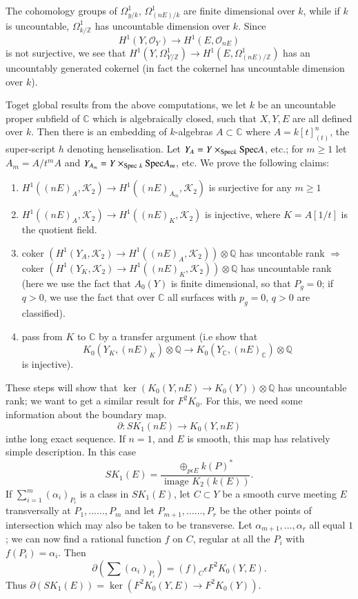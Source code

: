 The cohomology groups of $\Omega^{1}_{y/k}$, $\Omega^{1}_{(n E)/k}$  are finite dimensional over $k$, while if $k$ is uncountable, $\Omega^{1}_{k/\mathbb{Z}}$ has uncountable dimension over $k$. Since 
$$
H^{1}(Y, \mathscr{O}_Y)\to H^{1}(E, \mathscr{O}_{n E})
$$
is not surjective, we see that $H^{1}\left(Y, \Omega^{1}_{Y/\mathbb{Z}}\right)\to H^{1}\left(E, \Omega^{1}_{(n E)/\mathbb{Z}}\right)$ has an uncountably generated cokernel (in fact the cokernel has uncountable dimension over $k$). 

To\pageoriginale get global results from the above computations, we let $k$ be an uncountable proper subfield of $\mathbb{C}$ which is algebraically closed, such that $X, Y, E$ are all defined over $k$. Then there is an embedding of $k$-algebras $A\subset \mathbb{C}$ where $A=k[t]^{n}_{(t)}$, the super-script $h$ denoting henselisation. Let $Y_A=Y\times_{\mathrm{Spec} k}\mathrm{Spec} A$, etc.; for $m\geq 1$ let $A_m=A/t^{m} A$ and $Y_{A_{m}}=Y\times _{\mathrm{Spec}\ k}\mathrm{Spec} A_m$, etc. We prove the following claims: 
\begin{enumerate}
\renewcommand{\theenumi}{\roman{enumi}}
\renewcommand{\labelenumi}{(\theenumi)}
\item $H^{1}((nE)_A, \mathscr{K}_2)\to H^{1}((nE)_{A_m}, \mathscr{K}_2)$ is surjective for any $m\geq 1$ 
\item $H^{1}((n E)_A, \mathscr{K}_2)\to H^{1}((n E)_K, \mathscr{K}_2)$ is injective, where $K=A[1/t]$ is the quotient field. 
\item coker $(H^{1}(Y_A, \mathscr{K}_2)\to H^{1}((n E)_A, \mathscr{K}_2))\otimes \mathbb{Q}$ has uncontable rank $\Rightarrow$ coker $(H^{1}(Y_K, \mathscr{K}_2)\to H^{1}((nE)_K, \mathscr{K}_2))\otimes \mathbb{Q}$ has uncountable rank (here we use the fact that $A_0(Y)$ is finite dimensional, so that $P_g=0$; if $q>0$, we use the fact that over $\mathbb{C}$ all surfaces with $p_g=0$, $q>0$ are classified). 
\item pass from $K$ to $\mathbb{C}$ by a transfer argument (i.e show that 
$$
K_0(Y_K, (nE)_K)\otimes \mathbb{Q}\to K_0(Y_{\mathbb{C}}, (n E)_{\mathbb{C}})\otimes \mathbb{Q}
$$ 
is injective). 
\end{enumerate}

These steps will show that $\ker (K_0(Y, nE)\to K_0(Y))\otimes \mathbb{Q}$ has uncountable rank; we want to get a similar result for $F^{2}K_0$. For this, we need some information about the boundary map. 
$$
\partial:SK_1(nE)\to K_0(Y, nE)
$$
in\pageoriginale the long exact sequence. If $n=1$, and $E$ is smooth, this map has relatively simple description. In this case 
$$
SK_1(E)=\dfrac{\displaystyle\mathop{\oplus}_{p \epsilon E}k(P)^{\ast}}{\text{ image } K_2(k(E))}.
$$ 
If $\sum\limits_{i=1}^{m}(\alpha_i)_{P_i}$ is a class in $SK_1(E)$, let $C\subset Y$ be a smooth curve meeting $E$ transversally at $P_1, \ldots\ldots, P_m$ and let $P_{m+1},\ldots\ldots,P_r$ be the other points of intersection which may also be taken to be transverse. Let $\alpha_{m+1},\ldots,\alpha_r$ all equal $1$; we can now find a rational function $f$ on $C$, regular at all the $P_i$ with $f(P_i)=\alpha_i$. Then 
$$
\partial\left(\sum(\alpha_i)_{P_i}\right)=(f)_C\epsilon F^{2}K_0(Y,E).
$$
Thus $\partial(SK_1(E))=\ker (F^{2}K_0(Y, E)\to F^{2}K_0(Y))$. 

